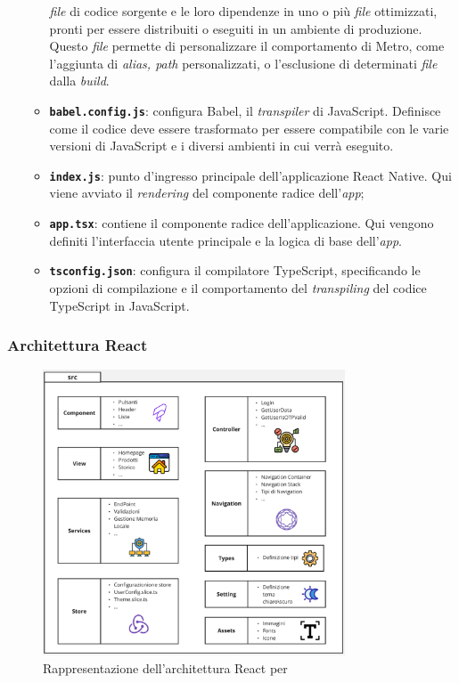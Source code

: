 \begin{itemize}
\begin{itemize}
                  \textit{file} di codice sorgente e le loro dipendenze in uno o più \textit{file} ottimizzati, pronti per essere distribuiti 
                  o eseguiti in un ambiente di produzione. Questo \textit{file} permette di personalizzare il comportamento di Metro, come 
                  l'aggiunta di \textit{alias, path} personalizzati, o l'esclusione di determinati \textit{file} dalla \textit{build}.
            \item \textbf{\texttt{babel.config.js}}: configura Babel, il \textit{transpiler} di JavaScript. 
                  Definisce come il codice deve essere trasformato per essere compatibile con le varie versioni di JavaScript e i 
                  diversi ambienti in cui verrà eseguito.
            \item \textbf{\texttt{index.js}}: punto d'ingresso principale dell'applicazione React Native. Qui viene 
                  avviato il \textit{rendering} del componente radice dell'\textit{app};
            \item \textbf{\texttt{app.tsx}}: contiene il componente radice dell'applicazione. Qui vengono definiti l'interfaccia 
                  utente principale e la logica di base dell'\textit{app}.
            \item \textbf{\texttt{tsconfig.json}}: configura il compilatore TypeScript, specificando le opzioni di compilazione 
            e il comportamento del \textit{transpiling} del codice TypeScript in JavaScript.
          \end{itemize}
\end{itemize}
\subsubsection{Architettura React}

\begin{figure}[H]
      \centering
      \includegraphics[width=0.8\textwidth]{img/react_architecture.png}
      \caption{Rappresentazione dell'architettura React per {\movi}}
      \label{fig:frontend architecture}
\end{figure}

